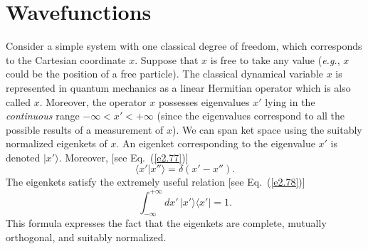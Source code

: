 \section{Wavefunctions}
Consider a simple system with one classical degree of freedom, which corresponds to
the Cartesian coordinate $x$. Suppose that $x$ is free to take any value ({\em e.g.},
$x$ could be the position of a free particle). The classical dynamical variable
$x$ is represented in quantum 
mechanics  as a linear Hermitian operator which is also called  $x$.
Moreover, the operator $x$ possesses eigenvalues $x'$
lying in the {\em continuous}
range $-\infty< x'<+\infty$ (since the eigenvalues
correspond to all the possible results of a measurement of $x$). We can
span ket space using the suitably normalized eigenkets of $x$.
An eigenket corresponding to the eigenvalue $x'$ is denoted $|x'\rangle$.
Moreover, 
[see Eq.~(\ref{e2.77})]
\begin{equation}\label{e3.15}
\langle x' | x''\rangle = \delta(x'-x'').
\end{equation}
The eigenkets satisfy the extremely useful relation [see Eq.~(\ref{e2.78})]
\begin{equation}\label{e3.16}
\int_{-\infty}^{+\infty} d x' \, |x'\rangle\langle x'|= 1.
\end{equation}
This formula expresses the fact that the eigenkets are complete, mutually
orthogonal, and suitably normalized.

